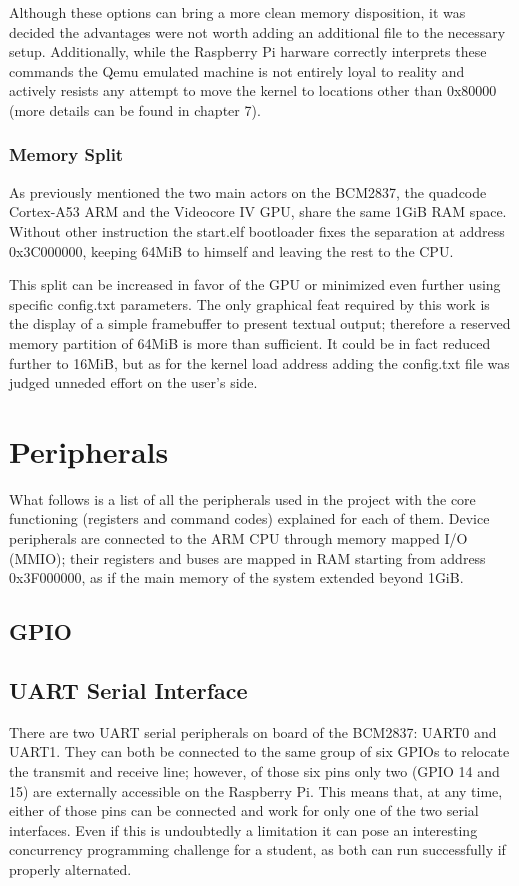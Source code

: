\documentclass[12pt,a4paper,openright,twoside]{report}
\begin{document}
Although these options can bring a more clean memory disposition, it was decided
the advantages were not worth adding an additional file to the necessary setup.
Additionally, while the Raspberry Pi harware correctly interprets these commands
the Qemu emulated machine is not entirely loyal to reality and actively resists
any attempt to move the kernel to locations other than 0x80000 (more details can
be found in chapter 7).

\subsubsection{Memory Split}
As previously mentioned the two main actors on the BCM2837, the quadcode Cortex-A53 ARM
and the Videocore IV GPU, share the same 1GiB RAM space. Without other instruction
the start.elf bootloader fixes the separation at address 0x3C000000, keeping
64MiB to himself and leaving the rest to the CPU.

This split can be increased in favor of the GPU or minimized even further using
specific config.txt parameters. The only graphical feat required by this work
is the display of a simple framebuffer to present textual output; therefore
a reserved memory partition of 64MiB is more than sufficient.
It could be in fact reduced further to 16MiB, but as for the kernel load address 
adding the config.txt file was judged unneded effort on the user's side.

\section{Peripherals}
What follows is a list of all the peripherals used in the project with the core
functioning (registers and command codes) explained for each of them.
Device peripherals are connected to the ARM CPU through memory mapped I/O (MMIO);
their registers and buses are mapped in RAM starting from address 0x3F000000,
as if the main memory of the system extended beyond 1GiB.

\subsection{GPIO}

\subsection{UART Serial Interface}
There are two UART serial peripherals on board of the BCM2837: UART0 and UART1.
They can both be connected to the same group of six GPIOs to relocate the 
transmit and receive line; however, of those six pins only two (GPIO 14 and 15)
are externally accessible on the Raspberry Pi. This means that, at any time,
either of those pins can be connected and work for only one of the two serial
interfaces.
Even if this is undoubtedly a limitation it can pose an interesting
concurrency programming challenge for a student, as both can run successfully if 
properly alternated.
\end{document}

